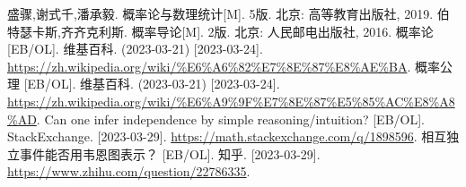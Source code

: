 \begin{thebibliography}{99}%
     盛骤,谢式千,潘承毅. 概率论与数理统计[M]. 5版. 北京: 高等教育出版社, 2019.
     伯特瑟卡斯,齐齐克利斯. 概率导论[M]. 2版. 北京: 人民邮电出版社, 2016.
     概率论 [EB/OL]. 维基百科. (2023-03-21) [2023-03-24]. \\\url{https://zh.wikipedia.org/wiki/%E6%A6%82%E7%8E%87%E8%AE%BA}.
     概率公理 [EB/OL]. 维基百科. (2023-03-21) [2023-03-24]. \\\url{https://zh.wikipedia.org/wiki/%E6%A9%9F%E7%8E%87%E5%85%AC%E8%A8%AD}.
     Can one infer independence by simple reasoning/intuition? [EB/OL]. StackExchange. [2023-03-29]. \url{https://math.stackexchange.com/q/1898596}.
     相互独立事件能否用韦恩图表示？ [EB/OL]. 知乎. [2023-03-29]. \\\url{https://www.zhihu.com/question/22786335}.
\end{thebibliography}
